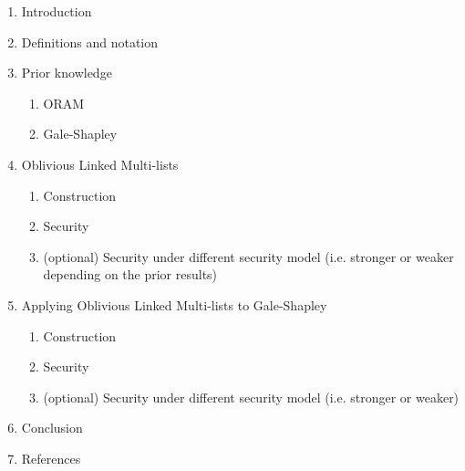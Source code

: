 \begin{enumerate}
  \item Introduction
  \item Definitions and notation
  \item Prior knowledge
  \begin{enumerate}
    \item ORAM
    \item Gale-Shapley
  \end{enumerate}
  \item Oblivious Linked Multi-lists
  \begin{enumerate}
    \item Construction
    \item Security
    \item \color{gray}(optional) Security under different security model (i.e. stronger or weaker depending on the prior results)
  \end{enumerate}
  \item Applying Oblivious Linked Multi-lists to Gale-Shapley
  \begin{enumerate}
    \item Construction
    \item Security
    \item \color{gray}(optional) Security under different security model (i.e. stronger or weaker)
  \end{enumerate}
  \item Conclusion
  \item References
\end{enumerate}
